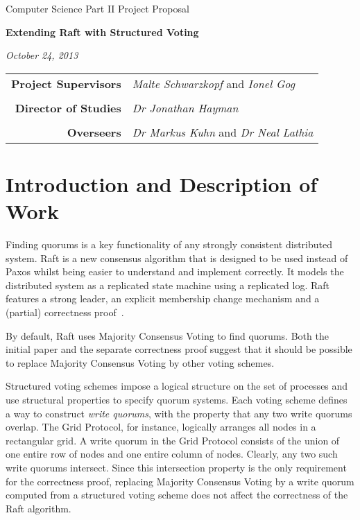 \documentclass[12pt]{scrartcl}
\begin{document}
\thispagestyle{empty}

 \medskip
{} \medskip
{}

\vfil

\centerline{\large Computer Science Part \textsc{II} Project Proposal} \vspace{0.4in}
\centerline{\Large\bf Extending Raft with Structured Voting} \vspace{0.3in}
\centerline{\large\it October 24, 2013}

\vfil

\begin{center}
\begin{tabularx}{316pt}{rX}
\textbf{Project Supervisors} & \textit{Malte Schwarzkopf} and \textit{Ionel Gog} \\ \\
\textbf{Director of Studies} & \textit{Dr Jonathan Hayman} \\ \\
\textbf{Overseers} & \textit{Dr Markus Kuhn} and \textit{Dr Neal Lathia}
\end{tabularx}
\end{center}

\newpage

\section{Introduction and Description of Work%
  \label{introduction-and-description-of-work}%
}

Finding quorums is a key functionality of any strongly consistent distributed system. Raft \cite{raft} is a new consensus algorithm that is designed to be used instead of Paxos \cite{paxos} whilst being easier to understand and implement correctly. It models the distributed system as a replicated state machine using a replicated log. Raft features a strong leader, an explicit membership change mechanism and a (partial) correctness proof~\cite{proof}.

By default, Raft uses Majority Consensus Voting to find quorums. Both the initial paper and the separate correctness proof suggest that it should be possible to replace Majority Consensus Voting by other voting schemes.

Structured voting schemes \cite{voting} impose a logical structure on the set of processes and use structural properties to specify quorum systems. Each voting scheme defines a way to construct \emph{write quorums}, with the property that any two write quorums overlap. The Grid Protocol, for instance, logically arranges all nodes in a rectangular grid. A write quorum in the Grid Protocol consists of the union of one entire row of nodes and one entire column of nodes. Clearly, any two such write quorums intersect. Since this intersection property is the only requirement for the correctness proof, replacing Majority Consensus Voting by a write quorum computed from a structured voting scheme does not affect the correctness of the Raft algorithm.
\end{document}
